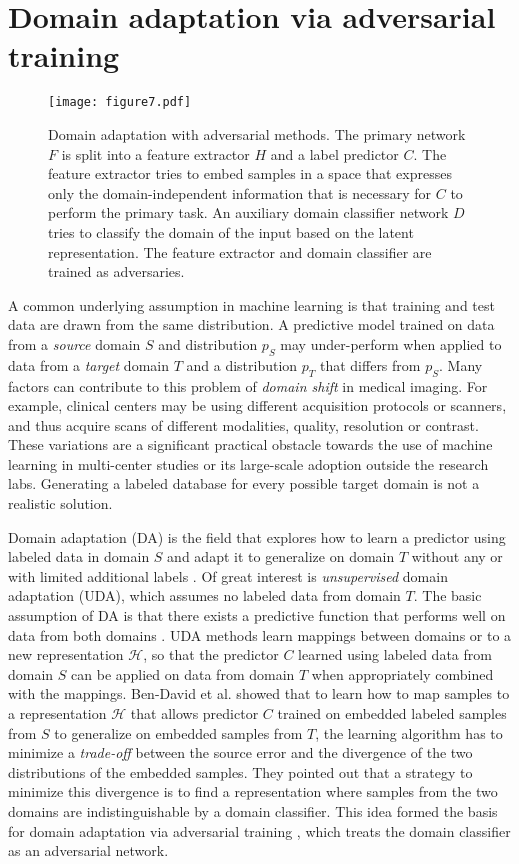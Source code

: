 \documentclass{article}
\begin{document}
\section{Domain adaptation via adversarial training}
\label{sec:theory_da}

\begin{figure}[tp]
\centering
\texttt{[image: figure7.pdf]}
\caption{Domain adaptation with adversarial methods. The primary network $F$ is split into a feature extractor $H$ and a label predictor $C$. The feature extractor tries to embed samples in a space that expresses only the domain-independent information that is necessary for $C$ to perform the primary task. An auxiliary domain classifier network $D$ tries to classify the domain of the input based on the latent representation. The feature extractor and domain classifier are trained as adversaries.}
\label{fig:ADA}
\end{figure}

A common underlying assumption in machine learning is that training and test data are drawn from the same distribution. A predictive model trained on data from a \emph{source} domain $S$ and distribution $p_S$ may under-perform when applied to data from a \emph{target} domain $T$ and a distribution $p_T$ that differs from $p_S$. Many factors can contribute to this problem of \emph{domain shift} in medical imaging. For example, clinical centers may be using different acquisition protocols or scanners, and thus acquire scans of different modalities, quality, resolution or contrast. These variations are a significant practical obstacle towards the use of machine learning in multi-center studies or its large-scale adoption outside the research labs. Generating a labeled database for every possible target domain is not a realistic solution.

Domain adaptation (DA) is the field that explores how to learn a predictor using labeled data in domain $S$ and adapt it to generalize on domain $T$ without any or with limited additional labels \cite{ben2010theory}. Of great interest is \emph{unsupervised} domain adaptation (UDA), which assumes no labeled data from domain $T$. The basic assumption of DA is that there exists a predictive function that performs well on data from both domains \cite{ben2010theory}. 
UDA methods learn mappings between domains or to a new representation $\mathcal{H}$, so that the predictor $C$ learned using labeled data from domain $S$ can be applied on data from domain $T$ when appropriately combined with the mappings.
Ben-David et al. \cite{ben2010theory} showed that to learn how to map samples to a representation $\mathcal{H}$ that allows predictor $C$ trained on embedded labeled samples from $S$ to generalize on embedded samples from $T$, the learning algorithm has to minimize a \emph{trade-off} between the source error and the divergence of the two distributions of the embedded samples. 
They pointed out that a strategy to minimize this divergence is to find a representation where samples from the two domains are indistinguishable by a domain classifier. This idea formed the basis for domain adaptation via adversarial training  \cite{ganin2016domain}, which treats the domain classifier as an adversarial network.
\end{document}
